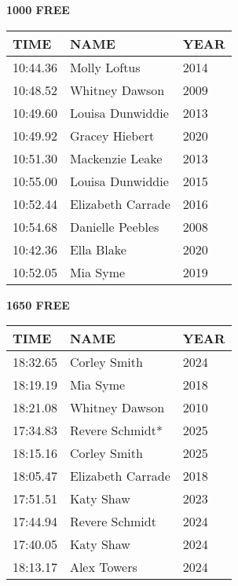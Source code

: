 \begin{minipage}[t]{0.48\textwidth}
\centering
\textbf{1000 FREE}\\[0.05cm]
\begin{tabular}{@{}p{1.8cm}p{2.8cm}p{1.2cm}@{}}
\hline
\textbf{TIME} & \textbf{NAME} & \textbf{YEAR} \\
\hline
10:44.36 & Molly Loftus & 2014 \\
10:48.52 & Whitney Dawson & 2009 \\
10:49.60 & Louisa Dunwiddie & 2013 \\
10:49.92 & Gracey Hiebert & 2020 \\
10:51.30 & Mackenzie Leake & 2013 \\
10:55.00 & Louisa Dunwiddie & 2015 \\
10:52.44 & Elizabeth Carrade & 2016 \\
10:54.68 & Danielle Peebles & 2008 \\
10:42.36 & Ella Blake & 2020 \\
10:52.05 & Mia Syme & 2019 \\
\hline
\end{tabular}
\end{minipage}\hfill
\begin{minipage}[t]{0.48\textwidth}
\centering
\textbf{1650 FREE}\\[0.05cm]
\begin{tabular}{@{}p{1.8cm}p{2.8cm}p{1.2cm}@{}}
\hline
\textbf{TIME} & \textbf{NAME} & \textbf{YEAR} \\
\hline
18:32.65 & Corley Smith & 2024 \\
18:19.19 & Mia Syme & 2018 \\
18:21.08 & Whitney Dawson & 2010 \\
17:34.83 & Revere Schmidt* & 2025 \\
18:15.16 & Corley Smith & 2025 \\
18:05.47 & Elizabeth Carrade & 2018 \\
17:51.51 & Katy Shaw & 2023 \\
17:44.94 & Revere Schmidt & 2024 \\
17:40.05 & Katy Shaw & 2024 \\
18:13.17 & Alex Towers & 2024 \\
\hline
\end{tabular}
\end{minipage}

\vspace{0.4cm}

